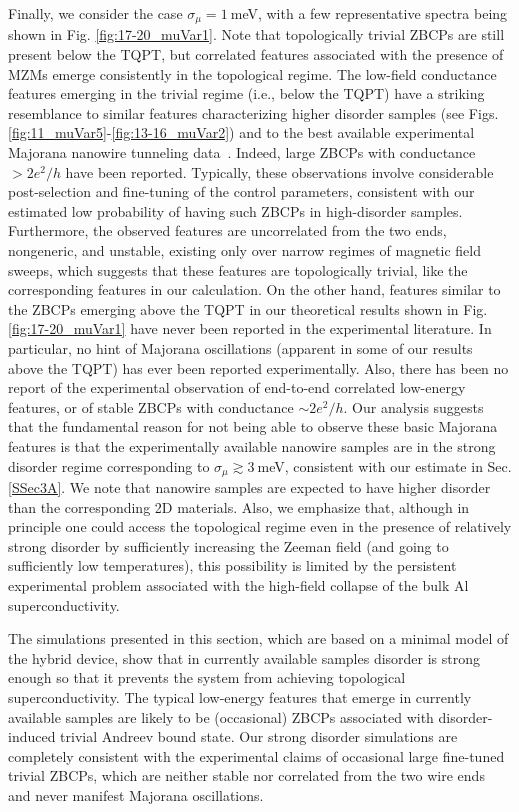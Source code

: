 \documentclass[aps,prmaterials,twocolumn,superscriptaddress,longbibliography]{revtex4-2}
\begin{document}
Finally, we consider the case $\sigma_\mu = 1~$meV, with a few representative spectra being shown in  Fig. \ref{fig:17-20_muVar1}. Note that topologically trivial ZBCPs are still present below the TQPT, but correlated features associated with the presence of MZMs emerge consistently in the topological regime. The low-field conductance features emerging in the trivial regime (i.e., below the TQPT) have a striking resemblance to similar features characterizing higher disorder samples (see Figs. \ref{fig:11_muVar5}-\ref{fig:13-16_muVar2}) and to the best available experimental Majorana nanowire tunneling data~\cite{zhang2021large,nichele2017scaling}. 
Indeed, large ZBCPs with conductance $>2e^2/h$ have been reported.  Typically, these observations involve considerable post-selection and fine-tuning of the control parameters, consistent with our estimated low probability of having such  ZBCPs in high-disorder samples. Furthermore, the observed features are uncorrelated from the two ends, nongeneric, and unstable, existing only over narrow regimes of magnetic field sweeps, which suggests that these features are topologically trivial, like the corresponding features in our calculation. On the other hand,  features similar to the ZBCPs emerging above the TQPT in our theoretical results shown in Fig. \ref{fig:17-20_muVar1} have never been reported in the experimental literature.  In particular, no hint of Majorana oscillations (apparent in some of our results above the TQPT) has ever been reported experimentally. Also, there has been no report of the experimental observation of end-to-end correlated low-energy features, or of stable ZBCPs with conductance $\sim 2e^2/h$.  
Our analysis suggests that the fundamental reason for not being able to observe these basic Majorana features is that the experimentally available nanowire samples are in 
the strong disorder regime corresponding to $\sigma_\mu \gtrsim 3~$meV, consistent with our estimate in Sec. \ref{SSec3A}. 
We note that nanowire samples are expected to have higher disorder than the corresponding 2D materials. Also, we emphasize that, although in principle one could access the topological regime even in the presence of relatively strong disorder by sufficiently increasing the Zeeman field (and going to sufficiently low temperatures), this possibility is limited by the persistent experimental problem associated with the high-field collapse of the bulk Al superconductivity.

The simulations presented in this section, which are based on a minimal model of the hybrid device, show that in currently available samples disorder is strong enough so that it prevents the system from achieving topological superconductivity. The typical low-energy features that emerge in currently available samples are likely to be (occasional) ZBCPs associated with disorder-induced trivial Andreev bound state. Our strong disorder simulations are completely consistent with the experimental claims of occasional large fine-tuned trivial ZBCPs, which are neither stable nor correlated from the two wire ends and never manifest Majorana oscillations.
\end{document}
